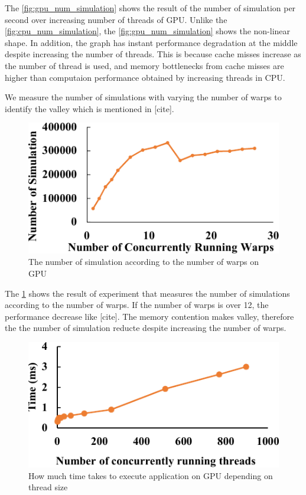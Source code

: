 \documentclass[conference]{IEEEtran}
\begin{document}
The \cref{fig:gpu_num_simulation} shows the result of the number of simulation per second over increasing number of threads of GPU. 
Unlike the \cref{fig:cpu_num_simulation}, the \cref{fig:gpu_num_simulation} shows the non-linear shape. 
In addition, the graph has instant performance degradation at the middle despite increasing the number of threads. 
This is because cache misses increase as the number of thread is used, and memory bottlenecks from cache misses are higher than computaion performance obtained by increasing threads in CPU.

We measure the number of simulations with varying the number of warps to identify the valley which is mentioned in [cite]. 
\begin{figure}
\includegraphics[width=0.95\columnwidth]{figures/gpu_warp_simulation.pdf}
\caption{The number of simulation according to the number of warps on GPU}
\label{fig:gpu_warp_simulation}
\end{figure}

The \cref{fig:gpu_warp_simulation} shows the result of experiment that measures the number of simulations according to the number of warps. 
If the number of warps is over 12, the performance decrease like [cite]. 
The memory contention makes valley, therefore the the number of simulation reducte despite increasing the number of warps. 

\begin{figure}
\includegraphics[width=0.95\columnwidth]{figures/gpu_thread_time.pdf}
\caption{How much time takes to execute application on GPU depending on thread size}
\label{fig:gpu_thread_time}
\end{figure}
\end{document}
